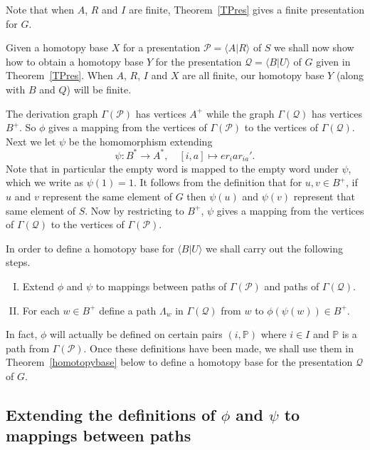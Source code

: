 \documentclass[11pt]{amsart}
\theoremstyle{plain}
\begin{document}
Note that when $A$, $R$ and $I$ are finite, Theorem~\ref{TPres} gives a finite presentation for $G$.

Given a homotopy base $X$ for a presentation $\mathcal{P} = {\langle} A | R {\rangle}$ of $S$ we shall now show how to obtain a homotopy base $Y$ for the presentation $\mathcal{Q} = {\langle} B | U {\rangle}$ of $G$ given in Theorem~\ref{TPres}. When $A$, $R$, $I$ and $X$ are all finite, our homotopy base $Y$ (along with $B$ and $Q$) will be finite.

 The derivation graph $\Gamma(\mathcal{P})$ has vertices $A^+$ while the graph $\Gamma(\mathcal{Q})$ has vertices $B^+$. So $\phi$ gives a mapping from the vertices of $\Gamma(\mathcal{P})$ to the vertices of $\Gamma(\mathcal{Q})$. Next we let $\psi$ be the homomorphism extending
\[
\psi: B^* \rightarrow A^*, \quad [i,a] \mapsto e r_i a r_{ia}'.
\]
Note that in particular the empty word is mapped to the empty word under $\psi$,  which we write as $\psi(1) = 1$. It follows from the definition that for $u,v \in B^+$, if $u$ and $v$ represent the same element of $G$ then $\psi(u)$ and $\psi(v)$ represent that same element of $S$. Now by restricting to $B^+$, $\psi$ gives a mapping from the vertices of $\Gamma(\mathcal{Q})$ to the vertices of $\Gamma(\mathcal{P})$.    

In order to define a homotopy base for ${\langle} B | U {\rangle}$ we shall carry out the following steps.
\begin{enumerate}[(I)]
\item Extend $\phi$ and $\psi$ to mappings between paths of $\Gamma(\mathcal{P})$ and paths of $\Gamma(\mathcal{Q})$.
\item For each $w \in B^+$ define a path $\Lambda_w$ in $\Gamma(\mathcal{Q})$ from $w$ to $\phi(\psi(w)) \in B^+$.
\end{enumerate}
In fact, $\phi$ will actually be defined on certain pairs $(i, {\mathbb{P}})$ where $i \in I$ and ${\mathbb{P}}$ is a path from $\Gamma(\mathcal{P})$. Once these definitions have been made, we shall use them in Theorem~\ref{homotopybase} below to define a homotopy base for the presentation $\mathcal{Q}$ of $G$.

\subsection*{\boldmath Extending the definitions of $\phi$ and $\psi$ to mappings between paths} 
\end{document}
